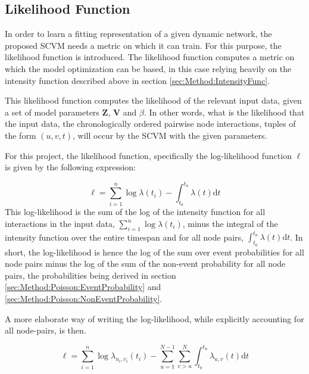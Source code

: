 \subsection{Likelihood Function}
\label{sec:Method:LikelihoodFunc}
In order to learn a fitting representation of a given dynamic network, the proposed SCVM needs a metric on which it can train.
For this purpose, the likelihood function is introduced.
The likelihood function computes a metric on which the model optimization can be based, in this case relying heavily on the intensity function described above in section \ref{sec:Method:IntensityFunc}.

This likelihood function computes the likelihood of the relevant input data, given a set of model parameters $\textbf{Z}$, $\textbf{V}$ and $\beta$.
In other words, what is the likelihood that the input data, the chronologically ordered pairwise node interactions, tuples of the form $(u, v, t)$, will occur by the SCVM with the  given parameters.

For this project, the likelihood function, specifically the log-likelihood function $\ell$ is given by the following expression:

\begin{equation}
    \ell = \sum_{i=1}^n \log \lambda (t_i) - \int_{t_0}^{t_n} \lambda(t) \mathrm{d} t
    \label{eq:LogLikelihoodFunc}
\end{equation}
This log-likelihood is the sum of the log of the intensity function for all interactions in the input data, $\sum_{i=1}^n \log \lambda (t_i)$, minus the integral of the intensity function over the entire timespan and for all node pairs, $\int_{t_0}^{t_n} \lambda(t) \mathrm{d} t$.
In short, the log-likelihood is hence the log of the sum over event probabilities for all node pairs minus the log of the sum of the non-event probability for all node pairs, the probabilities being derived in section \ref{sec:Method:Poisson:EventProbability} and \ref{sec:Method:Poisson:NonEventProbability}.

A more elaborate way of writing the log-likelihood, while explicitly accounting for all node-pairs, is then.

\begin{equation}
    \ell = \sum_{i=1}^n \log \lambda_{u_i,v_i} (t_i) - \sum_{u=1}^{N-1} \sum_{v > u}^{N} \int_{t_0}^{t_n} \lambda_{u,v}(t) \mathrm{d} t
    \label{eq:LogLikelihoodFuncExplicit}
\end{equation}







